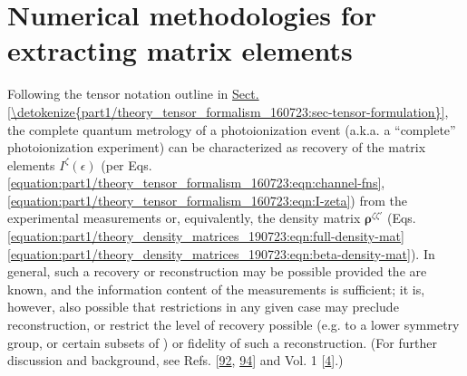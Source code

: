 \documentclass[letterpaper,table,10pt,english]{jupyterBook}
\begin{document}
\chapter{Numerical methodologies for extracting matrix elements}
\label{\detokenize{part1/numerics_070723:numerical-methodologies-for-extracting-matrix-elements}}\label{\detokenize{part1/numerics_070723:chpt-numerical-details}}\label{\detokenize{part1/numerics_070723::doc}}
\sphinxAtStartPar
Following the tensor notation outline in \hyperref[\detokenize{part1/theory_tensor_formalism_160723:sec-tensor-formulation}]{Sect.\@ \ref{\detokenize{part1/theory_tensor_formalism_160723:sec-tensor-formulation}}}, the complete quantum metrology of a photoionization event (a.k.a. a “complete” photoionization experiment) can be characterized as recovery of the matrix elements \(I^{\zeta}(\epsilon)\) (per Eqs. \eqref{equation:part1/theory_tensor_formalism_160723:eqn:channel-fns}, \eqref{equation:part1/theory_tensor_formalism_160723:eqn:I-zeta}) from the experimental measurements or, equivalently, the density matrix \(\mathbf{\rho}^{\zeta\zeta'}\) (Eqs. \eqref{equation:part1/theory_density_matrices_190723:eqn:full-density-mat} \sphinxhyphen{} \eqref{equation:part1/theory_density_matrices_190723:eqn:beta-density-mat}). In general, such a recovery or reconstruction may be possible provided the {\hyperref[\detokenize{backmatter/glossary:term-channel-functions}]{}} are known, and the information content of the measurements is sufficient; it is, however, also possible that restrictions in any given case may preclude reconstruction, or restrict the level of recovery possible (e.g. to a lower symmetry group, or certain subsets of {\hyperref[\detokenize{backmatter/glossary:term-radial-matrix-elements}]{}}) or fidelity of such a reconstruction. (For further discussion and background, see Refs. {[}\hyperlink{cite.backmatter/bibliography:id842}{92}, \hyperlink{cite.backmatter/bibliography:id725}{94}{]} and  Vol. 1 {[}\hyperlink{cite.backmatter/bibliography:id677}{4}{]}.)
\end{document}
